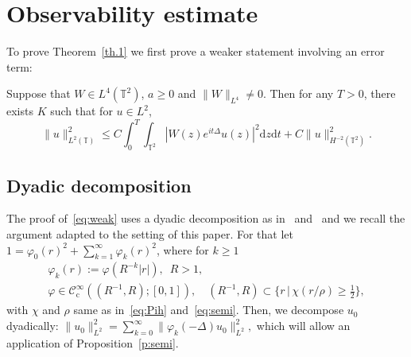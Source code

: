 \documentclass[AHL, Unicode, longabstracts]{cedram}
\newcommand{\CIc}{{\mathcal C}^\infty_{\mathrm{c}} }
\newcommand{\TT}{{\mathbb T}}
\newcommand{\TT}{{\mathbb T}}
\newcommand*{\dd}{\mathrm{d}}
\newcommand*{\dz}{\dd z}
\newcommand*{\dt}{\dd t}
\newcommand*{\tq}{\,|\,}
\begin{document}
\section{Observability estimate}\label{obs}

To prove Theorem~\ref{th.1} we first prove a weaker statement involving an error term:

\begin{prop}\label{p:weak}
Suppose that $ W \in L^4 (\TT^2) $, $ a \geq 0 $ and $ \| W \|_{ L^4 } \neq 0 $. Then for any $ T > 0 $, there exists $ K $ such that for $ u \in L^2 $,
\begin{equation}\label{eq:weak}
\| u \|_{ L^2 (\TT) }^2 \leq C \int_0^T \int_{\TT^2 } | W(z) e^{ i t \Delta } u (z) |^2 \dz \dt + C \| u \|^2_{ H^{-2} (\TT^2) }.
\end{equation}
\end{prop}

\subsection{Dyadic decomposition}\label{dya}
The proof of~\eqref{eq:weak} uses a dyadic decomposition as in~\cite[Section~5.1]{BBZ} and~\cite[Section~4]{BZ4} and we recall the argument adapted to the setting of this paper. For that let $ 1= \varphi_{0} (r)^2 + \sum_{k=1}^{\infty} \varphi_{k} (r)^2$, where for $ k \geq 1 $
\begin{gather*}
\varphi_{k} (r) := \varphi(R ^{-k} |r|), \enspace R > 1, \\ \varphi \in \CIc ((R^{-1}, R) ; [0, 1]), \quad (R^{-1}, R) \subset \{ r \tq \chi(r / \rho) \geq
\textstyle{\frac12} \},
\end{gather*}
with $ \chi $ and $ \rho $ same as in~\eqref{eq:Pih} and~\eqref{eq:semi}. Then, we decompose $u_0$ dyadically: $\|u_0 \|^2_{L^2} = \sum_{k=0}^\infty \|\varphi_{k}(- \Delta) u_0 \|_{L^2}^2, $ which will allow an application of Proposition~\ref{p:semi}.
\end{document}
